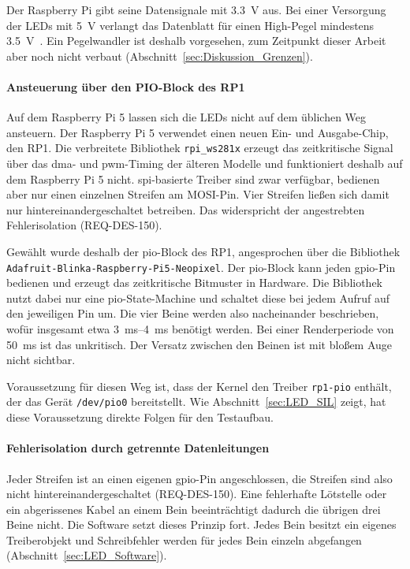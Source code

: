             Der Raspberry Pi gibt seine Datensignale mit \SI{3,3}{\volt} aus. Bei einer Versorgung der LEDs mit \SI{5}{\volt} verlangt das Datenblatt für einen High-Pegel mindestens \SI{3,5}{\volt}~\cite{ws2812btds}. Ein Pegelwandler ist deshalb vorgesehen, zum Zeitpunkt dieser Arbeit aber noch nicht verbaut (Abschnitt~\ref{sec:Diskussion_Grenzen}). %

            \paragraph{Ansteuerung über den PIO-Block des RP1}
            Auf dem Raspberry Pi 5 lassen sich die LEDs nicht auf dem üblichen Weg ansteuern. Der Raspberry Pi 5 verwendet einen neuen Ein- und Ausgabe-Chip, den RP1. Die verbreitete Bibliothek \texttt{rpi\_ws281x} erzeugt das zeitkritische Signal über das \gls{dma}- und \gls{pwm}-Timing der älteren Modelle und funktioniert deshalb auf dem Raspberry Pi 5 nicht. \gls{spi}-basierte Treiber sind zwar verfügbar, bedienen aber nur einen einzelnen Streifen am MOSI-Pin. Vier Streifen ließen sich damit nur hintereinandergeschaltet betreiben. Das widerspricht der angestrebten Fehlerisolation (REQ-DES-150). %

            Gewählt wurde deshalb der \gls{pio}-Block des RP1, angesprochen über die Bibliothek \texttt{Adafruit-Blinka-Raspberry-Pi5-Neopixel}. Der \gls{pio}-Block kann jeden \gls{gpio}-Pin bedienen und erzeugt das zeitkritische Bitmuster in Hardware. Die Bibliothek nutzt dabei nur eine \gls{pio}-State-Machine und schaltet diese bei jedem Aufruf auf den jeweiligen Pin um. Die vier Beine werden also nacheinander beschrieben, wofür insgesamt etwa \SIrange{3}{4}{\milli\second} benötigt werden. Bei einer Renderperiode von \SI{50}{\milli\second} ist das unkritisch. Der Versatz zwischen den Beinen ist mit bloßem Auge nicht sichtbar. %

            Voraussetzung für diesen Weg ist, dass der Kernel den Treiber \texttt{rp1-pio} enthält, der das Gerät \texttt{/dev/pio0} bereitstellt. Wie Abschnitt~\ref{sec:LED_SIL} zeigt, hat diese Voraussetzung direkte Folgen für den Testaufbau.

            \paragraph{Fehlerisolation durch getrennte Datenleitungen}
            Jeder Streifen ist an einen eigenen \gls{gpio}-Pin angeschlossen, die Streifen sind also nicht hintereinandergeschaltet (REQ-DES-150). Eine fehlerhafte Lötstelle oder ein abgerissenes Kabel an einem Bein beeinträchtigt dadurch die übrigen drei Beine nicht. Die Software setzt dieses Prinzip fort. Jedes Bein besitzt ein eigenes Treiberobjekt und Schreibfehler werden für jedes Bein einzeln abgefangen (Abschnitt~\ref{sec:LED_Software}).

